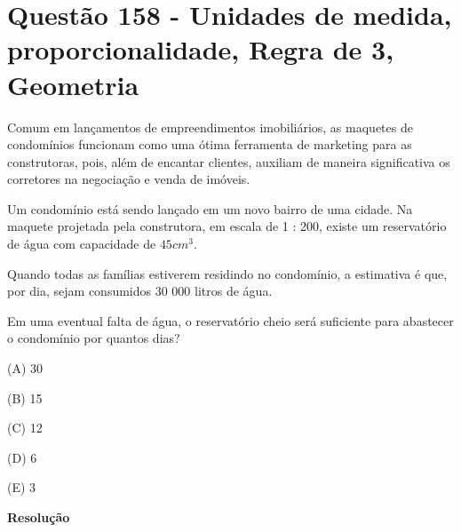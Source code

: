 \section{Questão 158 - Unidades de medida, proporcionalidade, Regra de 3, Geometria}

Comum em lançamentos de empreendimentos imobiliários, as maquetes de condomínios funcionam como uma ótima ferramenta de marketing para as construtoras, pois, além de encantar clientes, auxiliam de maneira significativa os corretores na negociação e venda de imóveis.

Um condomínio está sendo lançado em um novo bairro de uma cidade. Na maquete projetada pela construtora, em escala de 1 : 200, existe um reservatório de água com capacidade de $ 45 cm^3 $.

Quando todas as famílias estiverem residindo no condomínio, a estimativa é que, por dia, sejam consumidos 30 000 litros de água. 

Em uma eventual falta de água, o reservatório cheio será suficiente para abastecer o condomínio por quantos dias?

(A)  30

(B)  15

(C)  12

(D)  6

(E)  3


\textbf{Resolução}
\noindent {}

